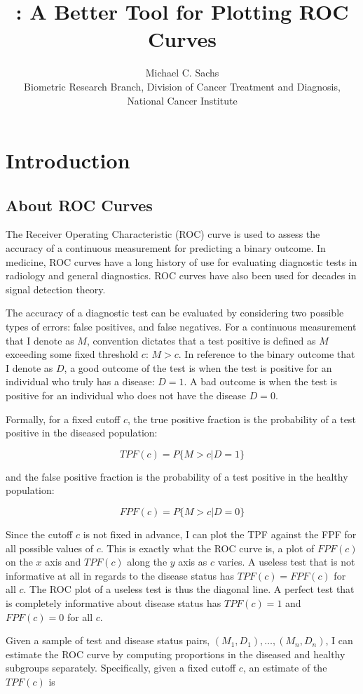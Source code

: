 \documentclass[article]{jss}
\author{		Michael C. Sachs\\Biometric Research Branch, Division of Cancer Treatment and Diagnosis,
National Cancer Institute		}
\title{\pkg{plotROC}: A Better Tool for Plotting ROC Curves}
\begin{document}
\section{Introduction}\label{introduction}

\subsection{About ROC Curves}\label{about-roc-curves}

The Receiver Operating Characteristic (ROC) curve is used to assess the
accuracy of a continuous measurement for predicting a binary outcome. In
medicine, ROC curves have a long history of use for evaluating
diagnostic tests in radiology and general diagnostics. ROC curves have
also been used for decades in signal detection theory.

The accuracy of a diagnostic test can be evaluated by considering two
possible types of errors: false positives, and false negatives. For a
continuous measurement that I denote as \(M\), convention dictates that
a test positive is defined as \(M\) exceeding some fixed threshold
\(c\): \(M > c\). In reference to the binary outcome that I denote as
\(D\), a good outcome of the test is when the test is positive for an
individual who truly has a disease: \(D = 1\). A bad outcome is when the
test is positive for an individual who does not have the disease
\(D = 0\).

Formally, for a fixed cutoff \(c\), the true positive fraction is the
probability of a test positive in the diseased population:

\[ TPF(c) = P\{ M > c | D = 1 \} \]

and the false positive fraction is the probability of a test positive in
the healthy population:

\[ FPF(c) = P\{ M > c | D = 0 \} \]

Since the cutoff \(c\) is not fixed in advance, I can plot the TPF
against the FPF for all possible values of \(c\). This is exactly what
the ROC curve is, a plot of \(FPF(c)\) on the \(x\) axis and \(TPF(c)\)
along the \(y\) axis as \(c\) varies. A useless test that is not
informative at all in regards to the disease status has
\(TPF(c) = FPF(c)\) for all \(c\). The ROC plot of a useless test is
thus the diagonal line. A perfect test that is completely informative
about disease status has \(TPF(c) = 1\) and \(FPF(c) = 0\) for all
\(c\).

Given a sample of test and disease status pairs,
\((M_1, D_1), \ldots, (M_n, D_n)\), I can estimate the ROC curve by
computing proportions in the diseased and healthy subgroups separately.
Specifically, given a fixed cutoff \(c\), an estimate of the \(TPF(c)\)
is
\end{document}
